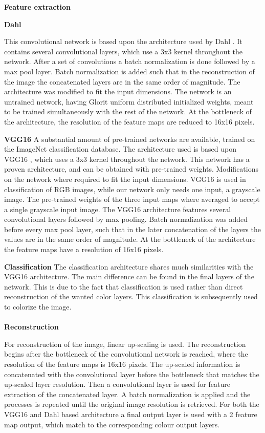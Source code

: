 {\color{red}
\textbf{Feature extraction}


\textbf{Dahl}%


This convolutional network is based upon the architecture used by Dahl \cite{Dahl}. It contains several convolutional layers, which use a 3x3 kernel throughout the network. After a set of convolutions a batch normalization is done followed by a max pool layer. Batch normalization is added such that in the reconstruction of the image the concatenated layers are in the same order of magnitude. The architecture was modified to fit the input dimensions. The network is an untrained network, having Glorit uniform distributed \cite{Glorot} initialized weights, meant to be trained simultaneously with the rest of the network. At the bottleneck of the architecture, the resolution of the feature maps are reduced to 16x16 pixels.
 

\textbf{VGG16}
A substantial amount of pre-trained networks are available, trained on the ImageNet classification database. The architecture used is based upon VGG16 \cite{Simonyan}, which uses a 3x3 kernel throughout the network. This network has a proven architecture, and can be obtained with pre-trained weights. Modifications on the network where required to fit the input dimensions. VGG16 is used in classification of RGB images, while our network only needs one input, a grayscale image. The pre-trained weights of the three input maps where averaged to accept a single grayscale input image. The VGG16 architecture features several convolutional layers followed by max pooling. Batch normalization was added before every max pool layer, such that in the later concatenation of the layers the values are in the same order of magnitude. At the bottleneck of the architecture the feature maps have a resolution of 16x16 pixels.

\textbf{Classification}
The classification architecture shares much similarities with the VGG16 architecture. The main difference can be found in the final layers of the network. This is due to the fact that classification is used rather than direct reconstruction of the wanted color layers. This classification is subsequently used to colorize the image. \\
\\
\textbf{Reconstruction}

For reconstruction of the image, linear up-scaling is used. The reconstruction begins after the bottleneck of the convolutional network is reached, where the resolution of the feature maps is 16x16 pixels. The up-scaled information is concatenated with the convolutional layer before the bottleneck that matches the up-scaled layer resolution. Then a convolutional layer is used for feature extraction of the concatenated layer. A batch normalization is applied and the processes is repeated until the original image resolution is retrieved. For both the VGG16 and Dahl based architecture a final output layer is used with a 2 feature map output, which match to the corresponding colour output layers.

}
